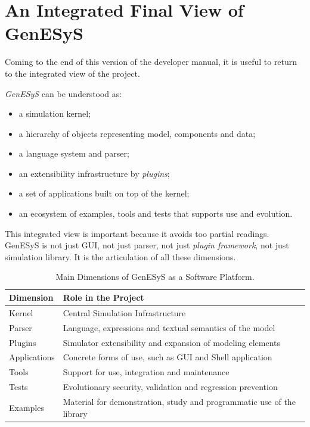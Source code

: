 \section{An Integrated Final View of GenESyS}
\label{sec:cap10_visao_final_integrada_genesys}

Coming to the end of this version of the developer manual, it is useful to return to the integrated view of the project.

\textit{GenESyS} can be understood as:

\begin{itemize}
 \item a simulation kernel;
 \item a hierarchy of objects representing model, components and data;
 \item a language system and parser;
 \item an extensibility infrastructure by \textit{plugins};
 \item a set of applications built on top of the kernel;
 \item an ecosystem of examples, tools and tests that supports use and evolution.
\end{itemize}

This integrated view is important because it avoids too partial readings. GenESyS is not just GUI, not just parser, not just \textit{plugin framework}, not just simulation library. It is the articulation of all these dimensions.

\begin{table}[htbp]
 \centering
 \caption{Main Dimensions of GenESyS as a Software Platform.}
 \label{tab:cap10_dimensoes_principais_genesys}
 \small
 \begin{tabular}{|p{3.8cm}|p{7.4cm}|}
 \hline
 \textbf{Dimension} & \textbf{Role in the Project} \\
 \hline
 Kernel & Central Simulation Infrastructure \\
 \hline
 Parser & Language, expressions and textual semantics of the model \\
 \hline
 Plugins & Simulator extensibility and expansion of modeling elements \\
 \hline
 Applications & Concrete forms of use, such as GUI and Shell application \\
 \hline
 Tools & Support for use, integration and maintenance \\
 \hline
 Tests & Evolutionary security, validation and regression prevention \\
 \hline
 Examples & Material for demonstration, study and programmatic use of the library \\
 \hline
 \end{tabular}
\end{table}

